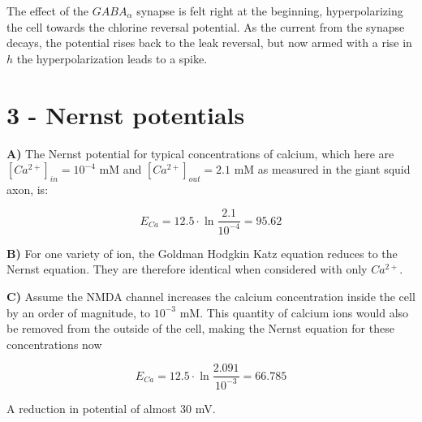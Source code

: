 \documentclass[12pt]{article}
\begin{document}
The effect of the $GABA_\alpha$ synapse is felt right at the beginning, hyperpolarizing the cell towards the chlorine reversal potential.  As the current from the synapse decays, the potential rises back to the leak reversal, but now armed with a rise in $h$ the hyperpolarization leads to a spike.

\section{3 - Nernst potentials}

{\bf A)}  The Nernst potential for typical concentrations of calcium, which here are $[Ca^{2+}]_{in}=10^{-4}$ mM and $[Ca^{2+}]_{out}=2.1$ mM as measured in the giant squid axon, is:

$$ E_{Ca}=12.5\cdot\ln\frac{2.1}{10^{-4}}=95.62 $$

{\bf B)}  For one variety of ion, the Goldman Hodgkin Katz equation reduces to the Nernst equation.  They are therefore identical when considered with only $Ca^{2+}$.

{\bf C)}  Assume the NMDA channel increases the calcium concentration inside the cell by an order of magnitude, to $10^{-3}$ mM.  This quantity of calcium ions would also be removed from the outside of the cell, making the Nernst equation for these concentrations now

$$ E_{Ca}=12.5\cdot\ln\frac{2.091}{10^{-3}}=66.785 $$

A reduction in potential of almost 30 mV.
\end{document}
